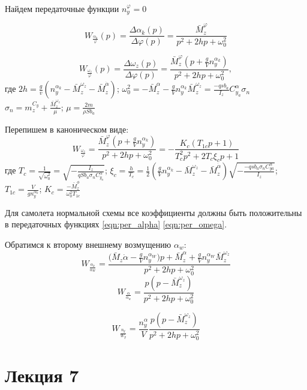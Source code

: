 \documentclass{article}
\begin{document}
Найдем передаточные функции $n_y^\varphi = 0$

\begin{equation}\label{eqn:per_alpha}
    W_{\frac{\alpha_k}{\varphi}}(p) = \frac{\Delta \alpha_k(p)}{\Delta
    \varphi(p)} = \frac{\bar{M}_z^\varphi}{p^2 + 2hp + \omega_0^2}
\end{equation}

\[
    W_{\frac{\omega_z}{\varphi}} (p) = \frac{\Delta \omega_z(p)}{\Delta
    \varphi(p)} =\frac{\bar{M}_z^\varphi(p + \frac{g}{V} n_y^{\alpha_k})}{p^2 +
    2hp + \omega_0^{2}},
\]
где $2h = \frac{g}{v}(n_y^{\alpha_k} - \bar{M}_z^{\omega_z} -
\bar{M}_z^{\dot{\alpha}})$; $\omega_0^2 = - \bar{M}_z^{\alpha} - \frac{g}{V}
n_y^{\alpha_k} \bar{M}_z^{\omega_z} = \frac{-qsb_a}{I_z} C_{y_a}^{\alpha}
\sigma_{n}$\\
$\sigma_n = m_z^{C_y} + \frac{\bar{M}_z^{\omega_z}}{\mu}$; $\mu = \frac{2
m}{\rho S b_a}$

Перепишем в каноническом виде:
\begin{equation}\label{eqn:per_omega}
    W_{\frac{\omega_z}{\varphi}} = \frac{\bar{M}_z^\varphi(p + \frac{g}{V}
    n_y^{\alpha_k})} {p^2 + 2hp + \omega_0^2}= %
    -\frac{K_c (T_{1c} p + 1)}{T^2_c p^2 + 2 T_c \xi_c p + 1}
\end{equation}
где $T_c = \frac{1}{\sqrt{\omega_0^2}} = \sqrt{-\frac{I_z}{q S b _a \sigma_n
C_{y_a}^{\alpha}}}$; $\xi_c = \frac{h}{T_c} = \frac{1}{2}( \frac{g}{V}
n_y^{\alpha_k} - \bar{M}_z^{\omega_z} - \bar{M}_z^{\dot{\alpha}})
\sqrt{-\frac{-q s b_a \sigma_n C_{ya}^{\alpha}}{I_z}}$; $T_{1c} = \frac{V}{g
n_y^{\alpha_k}}$; $K_c = \frac{-\bar{M}_z^\phi}{\omega_0^2 T_{1c}}$

Для самолета нормальной схемы все коэффициенты должны быть положительны в
передаточных функциях \eqref{eqn:per_alpha} \eqref{eqn:per_omega}.

Обратимся к второму внешнему возмущению $\alpha_w$:
\[
    W_{\frac{\alpha_k}{\alpha_W}} = \frac{(\bar{M}_z {\dot{\alpha} -
    \frac{g}{V} n_y^{\alpha_W}) p + \bar{M}_z^\alpha + \frac{g}{V}
n_y^{\alpha_W} \bar{M}_z^{\omega_z} }}{p^2 + 2hp + \omega_0^2}
\]
\[
    W_{\frac{\alpha}{\alpha_w}} = \frac{p(p - \bar{M}_z^{\omega_z})}{p^2 + 2hp+
    \omega_0^2}
\]

\[
    W_{\frac{n_y}{W_y}} = \frac{n_y^\alpha}{V} \frac{p(p -
    \bar{M}_z^{\omega_z})}{p^2 + 2hp + \omega_0^2}
\]
\newpage

\section{Лекция 7}
\end{document}
